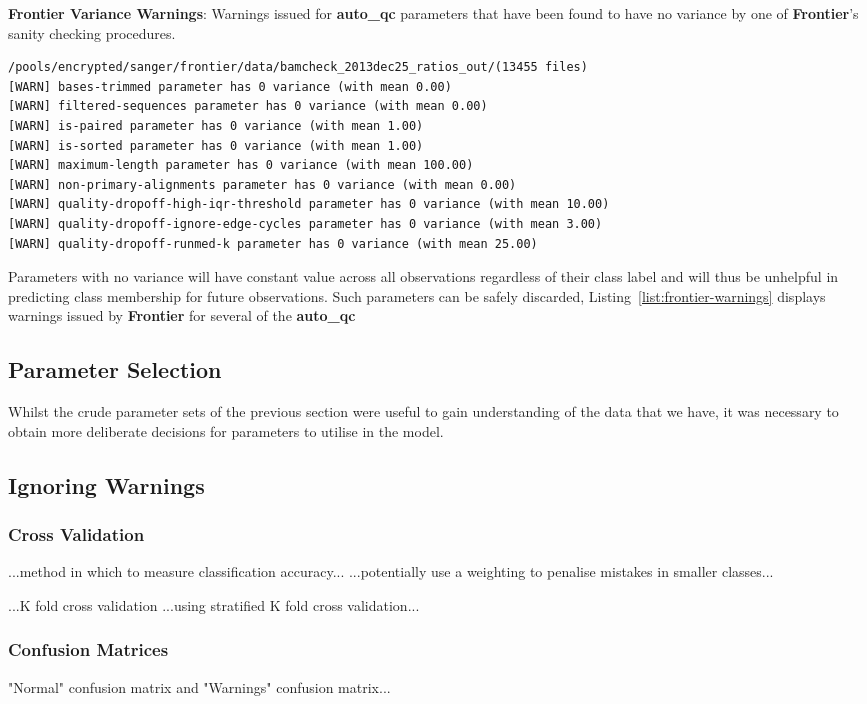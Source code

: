 \begin{listing}[H]
    \caption[frontier-warnings]{\textbf{Frontier Variance Warnings}:
        Warnings issued for \textbf{auto\_qc} parameters that have been found to
        have no variance by one of \textbf{Frontier}'s sanity checking procedures.}
    \label{list:frontier-warnings}
    \begin{verbatim}
/pools/encrypted/sanger/frontier/data/bamcheck_2013dec25_ratios_out/(13455 files)
[WARN] bases-trimmed parameter has 0 variance (with mean 0.00)
[WARN] filtered-sequences parameter has 0 variance (with mean 0.00)
[WARN] is-paired parameter has 0 variance (with mean 1.00)
[WARN] is-sorted parameter has 0 variance (with mean 1.00)
[WARN] maximum-length parameter has 0 variance (with mean 100.00)
[WARN] non-primary-alignments parameter has 0 variance (with mean 0.00)
[WARN] quality-dropoff-high-iqr-threshold parameter has 0 variance (with mean 10.00)
[WARN] quality-dropoff-ignore-edge-cycles parameter has 0 variance (with mean 3.00)
[WARN] quality-dropoff-runmed-k parameter has 0 variance (with mean 25.00)
    \end{verbatim}
\end{listing}

Parameters with no variance will have constant value across all observations
regardless of their class label and will thus be unhelpful in predicting class
membership for future observations. Such parameters can be safely discarded,
Listing~\ref{list:frontier-warnings} displays warnings issued by
\textbf{Frontier} for several of the \textbf{auto\_qc}

\subsection{Parameter Selection}

Whilst the crude parameter sets of the previous section were useful to gain
understanding of the data that we have, it was necessary to obtain more
deliberate decisions for parameters to utilise in the model.

\subsection{Ignoring Warnings}

\subsubsection{Cross Validation}

...method in which to measure classification accuracy...
...potentially use a weighting to penalise mistakes in smaller classes...

...K fold cross validation
...using stratified K fold cross validation...

\subsubsection{Confusion Matrices}
"Normal" confusion matrix and "Warnings" confusion matrix...

